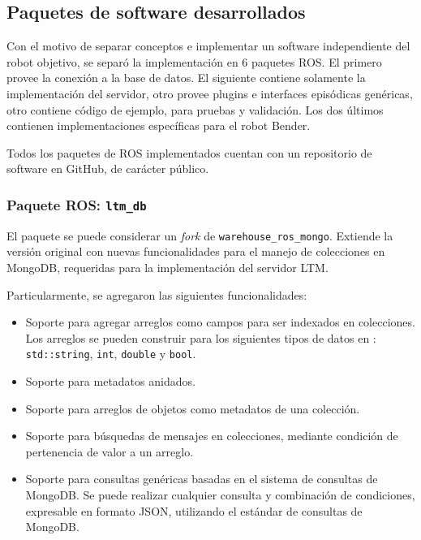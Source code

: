 \subsection{Paquetes de software desarrollados}\label{sec:impl_packages}

Con el motivo de separar conceptos e implementar un software independiente del robot objetivo, se separó la implementación en 6 paquetes ROS. El primero provee la conexión a la base de datos. El siguiente contiene solamente la implementación del servidor, otro provee plugins e interfaces episódicas genéricas, otro contiene código de ejemplo, para pruebas y validación. Los dos últimos contienen implementaciones específicas para el robot Bender.

Todos los paquetes de ROS implementados cuentan con un repositorio de software en GitHub, de carácter público.

\subsubsection{Paquete ROS: \texttt{ltm\_db}}

El paquete se puede considerar un \textit{fork} de \texttt{warehouse\_ros\_mongo}. Extiende la versión original con nuevas funcionalidades para el manejo de colecciones en MongoDB, requeridas para la implementación del servidor LTM.

Particularmente, se agregaron las siguientes funcionalidades:
\begin{itemize}
\item Soporte para agregar arreglos como campos para ser indexados en colecciones. Los arreglos se pueden construir para los siguientes tipos de datos en \CC: \texttt{std::string}, \texttt{int}, \texttt{double} y \texttt{bool}. 
\item Soporte para metadatos anidados.
\item Soporte para arreglos de objetos como metadatos de una colección.
\item Soporte para búsquedas de mensajes en colecciones, mediante condición de pertenencia de valor a un arreglo.
\item Soporte para consultas genéricas basadas en el sistema de consultas de MongoDB. Se puede realizar cualquier consulta y combinación de condiciones, expresable en formato JSON, utilizando el estándar de consultas de MongoDB.
\end{itemize}

